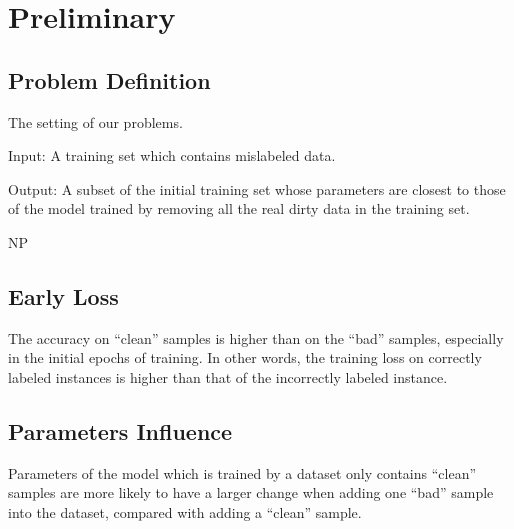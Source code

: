 \section{Preliminary} 
\label{sec:pre}

\subsection{Problem Definition}


The setting of our problems.

Input: A training set which contains mislabeled data.

Output: A subset of the initial training set whose parameters are closest to those of the model trained by removing all the real dirty data in the training set.

 NP

\subsection{Early Loss}

The accuracy on ``clean'' samples is higher than on the ``bad'' samples, especially in the initial epochs of training. In other words, the training loss on correctly labeled instances is higher than that of the incorrectly labeled instance.

\subsection{Parameters Influence}

Parameters of the model which is trained by a dataset only contains ``clean'' samples are more likely to have a larger change when adding one ``bad'' sample into the dataset, compared with adding a ``clean'' sample.